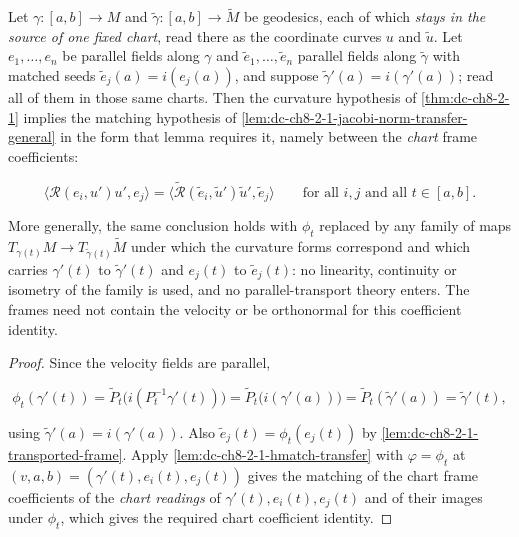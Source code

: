 \begin{lemma}
  \label{lem:dc-ch8-2-1-frame-chart-interface}


  Let $\gamma:[a,b]\to M$ and $\tilde\gamma:[a,b]\to\tilde M$ be geodesics, each of which
  \emph{stays in the source of one fixed chart}, read there as the coordinate curves $u$ and
  $\tilde u$. Let $e_1,\dots,e_n$ be parallel fields along $\gamma$ and $\tilde e_1,\dots,
  \tilde e_n$ parallel fields along $\tilde\gamma$ with matched seeds
  $\tilde e_j(a)=i(e_j(a))$, and suppose $\tilde\gamma'(a)=i(\gamma'(a))$; read all of them
  in those same charts. Then the curvature hypothesis of \cref{thm:dc-ch8-2-1} implies the
  matching hypothesis of \cref{lem:dc-ch8-2-1-jacobi-norm-transfer-general} in the form that
  lemma requires it, namely between the \emph{chart} frame coefficients:

  $$
  \langle\mathcal R(e_i,u')u',e_j\rangle
  =\big\langle\tilde{\mathcal R}(\tilde e_i,\tilde u')\tilde u',\tilde e_j\big\rangle
  \qquad\text{for all }i,j\text{ and all }t\in[a,b] .
  $$

  More generally, the same conclusion holds with $\phi_t$ replaced by any family of
  maps $T_{\gamma(t)}M\to T_{\tilde\gamma(t)}\tilde M$ under which the curvature forms
  correspond and which carries $\gamma'(t)$ to $\tilde\gamma'(t)$ and $e_j(t)$ to
  $\tilde e_j(t)$: no linearity, continuity or isometry of the family is used, and no
  parallel-transport theory enters. The frames need not contain the velocity or be
  orthonormal for this coefficient identity.
\end{lemma}
\begin{proof}

\sketch
  Since the velocity fields are parallel,

  $$
  \phi_t(\gamma'(t))=\tilde P_t\big(i(P_t^{-1}\gamma'(t))\big)=\tilde P_t\big(i(\gamma'(a))\big)
  =\tilde P_t(\tilde\gamma'(a))=\tilde\gamma'(t) ,
  $$

  using $\tilde\gamma'(a)=i(\gamma'(a))$. Also
  $\tilde e_j(t)=\phi_t(e_j(t))$ by \cref{lem:dc-ch8-2-1-transported-frame}.
  Apply \cref{lem:dc-ch8-2-1-hmatch-transfer} with $\varphi=\phi_t$ at
  $(v,a,b)=(\gamma'(t),e_i(t),e_j(t))$ gives the matching of the chart frame coefficients of
  the \emph{chart readings} of $\gamma'(t),e_i(t),e_j(t)$ and of their images under $\phi_t$,
  which gives the required chart coefficient identity.
\end{proof}


